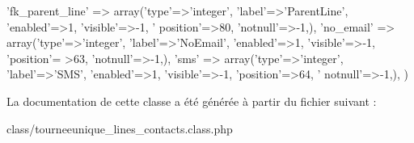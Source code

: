 \begin{DoxyCode}
        \textcolor{stringliteral}{'fk\_parent\_line'} => array(\textcolor{stringliteral}{'type'}=>\textcolor{stringliteral}{'integer'}, \textcolor{stringliteral}{'label'}=>\textcolor{stringliteral}{'ParentLine'}, \textcolor{stringliteral}{'enabled'}=>1, \textcolor{stringliteral}{'visible'}=>-1, \textcolor{stringliteral}{'
      position'}=>80, \textcolor{stringliteral}{'notnull'}=>-1,),
        \textcolor{stringliteral}{'no\_email'} => array(\textcolor{stringliteral}{'type'}=>\textcolor{stringliteral}{'integer'}, \textcolor{stringliteral}{'label'}=>\textcolor{stringliteral}{'NoEmail'}, \textcolor{stringliteral}{'enabled'}=>1, \textcolor{stringliteral}{'visible'}=>-1, \textcolor{stringliteral}{'position'}=
      >63, \textcolor{stringliteral}{'notnull'}=>-1,),
        \textcolor{stringliteral}{'sms'} => array(\textcolor{stringliteral}{'type'}=>\textcolor{stringliteral}{'integer'}, \textcolor{stringliteral}{'label'}=>\textcolor{stringliteral}{'SMS'}, \textcolor{stringliteral}{'enabled'}=>1, \textcolor{stringliteral}{'visible'}=>-1, \textcolor{stringliteral}{'position'}=>64, \textcolor{stringliteral}{'
      notnull'}=>-1,),
    )
\end{DoxyCode}


La documentation de cette classe a été générée à partir du fichier suivant \+:\begin{DoxyCompactItemize}
\item 
class/tourneeunique\+\_\+lines\+\_\+contacts.\+class.\+php\end{DoxyCompactItemize}
